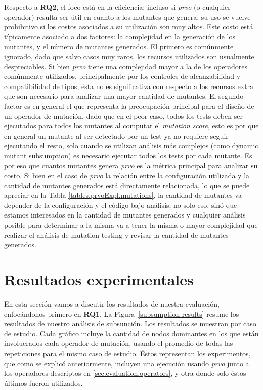 Respecto a \textbf{RQ2}, el foco est\'a en la eficiencia; incluso si \emph{prvo} (o cualquier operador) resulta ser \'util en cuanto a los mutantes que genera, su uso se vuelve prohibitivo si los costos asociados a su utilizaci\'on son muy altos. Este costo est\'a t\'ipicamente asociado a dos factores: la complejidad en la generaci\'on de los mutantes, y el n\'umero de mutantes generados. El primero es com\'unmente ignorado, dado que salvo casos muy raros, los recursos utilizados son usualmente despreciables. Si bien \emph{prvo} tiene una complejidad mayor a la de los operadores com\'unmente utilizados, principalmente por los controles de alcanzabilidad y compatibilidad de tipos, \'esta no es significativa con respecto a los recursos extra que son necesario para analizar una mayor cantidad de mutantes. El segundo factor es en general el que representa la preocupaci\'on principal para el dise\~no de un operador de mutaci\'on, dado que en el peor caso, todos los tests deben ser ejecutados para todos los mutantes al computar el \emph{mutation score}, esto es por que en general un mutante al ser detectado por un test ya no requiere seguir ejecutando el resto, solo cuando se utilizan an\'alisis m\'as complejos (como dynamic mutant subsumption) es necesario ejecutar todos los tests por cada mutante. Es por eso que cuantos mutantes genera \emph{prvo} es la m\'etrica principal para analizar su costo. Si bien en el caso de \emph{prvo} la relaci\'on entre la configuraci\'on utilizada y la cantidad de mutantes generados est\'a directamente relacionada, lo que se puede apreciar en la Tabla-\ref{tables.prvoExpl.mutations}, la cantidad de mutantes va depender de la configuraci\'on y el c\'odigo bajo an\'alisis, no solo eso, sin\'o que estamos interesados en la cantidad de mutantes generados y cualquier an\'alisis posible para determinar a la misma va a tener la misma o mayor complejidad que realizar el an\'alisis de mutation testing y revisar la cantidad de mutantes generados.

\section{Resultados experimentales}
\label{sec:evaluation.results}

En esta secci\'on vamos a discutir los resultados de nuestra evaluaci\'on, enfoc\'andonos primero en \textbf{RQ1}. La Figura~\ref{subsumption-results} resume los resultados de nuestro an\'alisis de subsunci\'on. Los resultados se muestran por caso de estudio. Cada gr\'afico incluye la cantidad de nodos dominantes en los que est\'an involucrados cada operador de mutaci\'on, usando el promedio de todas las repeticiones para el mismo caso de estudio. \'Estos representan los experimentos, que como se explic\'o anteriormente, incluyen una ejecuci\'on usando \emph{prvo} junto a los operadores descriptos en \ref{sec:evaluation.operators}, y otra donde solo \'estos \'ultimos fueron utilizados.

